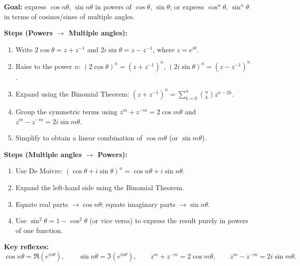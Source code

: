 \documentclass[11pt]{article}
\begin{document}
\begin{methode}
\textbf{Goal:} express $\cos n\theta$, $\sin n\theta$ in powers of $\cos\theta$, $\sin\theta$; or express $\cos^n\theta$, $\sin^n\theta$ in terms of cosines/sines of multiple angles.

\textbf{Steps (Powers $\to$ Multiple angles):}
\begin{enumerate}
    \item Write $2\cos\theta = z + z^{-1}$ and $2i\sin\theta = z - z^{-1}$, where $z=e^{i\theta}$.
    \item Raise to the power $n$: $(2\cos\theta)^n = (z+z^{-1})^n$, $(2i\sin\theta)^n = (z-z^{-1})^n$.
    \item Expand using the Binomial Theorem: $(z+z^{-1})^n = \displaystyle\sum_{k=0}^n \binom{n}{k} z^{n-2k}$.
    \item Group the symmetric terms using $z^m + z^{-m} = 2\cos m\theta$ and $z^m - z^{-m} = 2i\sin m\theta$.
    \item Simplify to obtain a linear combination of $\cos m\theta$ (or $\sin m\theta$).
\end{enumerate}

\textbf{Steps (Multiple angles $\to$ Powers):}
\begin{enumerate}
    \item Use De Moivre: $(\cos\theta + i\sin\theta)^n = \cos n\theta + i\sin n\theta$.
    \item Expand the left-hand side using the Binomial Theorem.
    \item Equate real parts $\to \cos n\theta$; equate imaginary parts $\to \sin n\theta$.
    \item Use $\sin^2\theta = 1-\cos^2\theta$ (or vice versa) to express the result purely in powers of one function.
\end{enumerate}

\textbf{Key reflexes:}
\[
\cos n\theta = \Re\!\left(e^{in\theta}\right),\qquad \sin n\theta = \Im\!\left(e^{in\theta}\right),\qquad z^m+z^{-m}=2\cos m\theta,\qquad z^m-z^{-m}=2i\sin m\theta .
\]
\end{methode}
\end{document}
